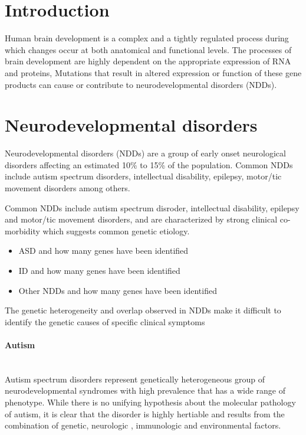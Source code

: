\documentclass[12pt]{article}
\begin{document}
\section{Introduction}
Human brain development is a complex and a tightly regulated process during which changes occur at both anatomical and functional levels.
The processes of brain development are highly dependent on the appropriate expression of RNA and proteins, 
Mutations that result in altered expression or function of these gene products can cause or contribute to neurodevelopmental disorders (NDDs). 



\section{Neurodevelopmental disorders}

Neurodevelopmental disorders (NDDs) are a group of early onset neurological disorders affecting an estimated 10\% to 15\% of the population. Common NDDs include autism spectrum disorders, intellectual disability, epilepsy, motor/tic movement disorders among others. 



Common NDDs include autism spectrum disroder, intellectual disability, epilepsy and motor/tic movement disorders, and are characterized by strong clinical co-morbidity which suggests common genetic etiology. 

\begin{itemize}
	\item ASD and how many genes have been identified 
	\item ID and how many genes have been identified 
	\item Other NDDs and how many genes have been identified 
\end{itemize}
The genetic heterogeneity and overlap observed in NDDs make it difficult to identify the genetic causes of specific clinical symptoms

\paragraph{Autism}

~\\ Autism spectrum disorders represent genetically heterogeneous group of neurodevelopmental syndromes with high prevalence that has a wide range of phenotype. While there is no unifying hypothesis about the molecular pathology of autism, it is clear that the disorder is highly hertiable and results from the combination of genetic, neurologic , immunologic and environmental factors. 
\end{document}
